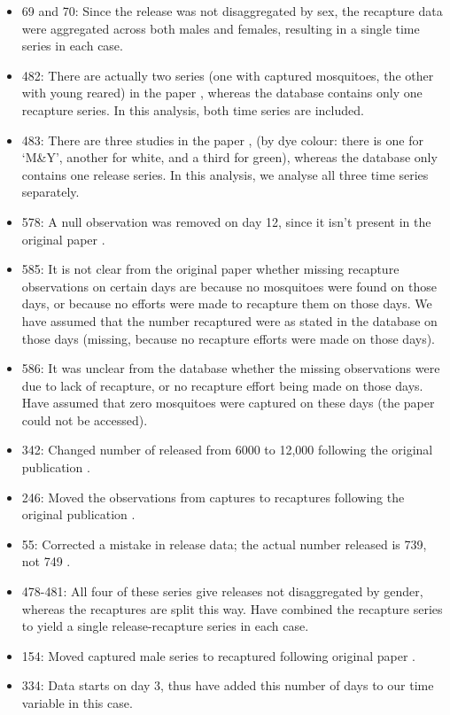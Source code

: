 \documentclass[12pt]{article}
\begin{document}
\begin{itemize}
	\item 69 and 70: Since the release was not disaggregated by sex, the recapture data were aggregated across both males and females, resulting in a single time series in each case.
	\item 482: There are actually two series (one with captured mosquitoes, the other with young reared) in the paper \cite[]{rawlings1981influence}, whereas the database contains only one recapture series. In this analysis, both time series are included.
	\item 483: There are three studies in the paper \cite[]{rawlings1981influence}, (by dye colour: there is one for `M\&Y', another for white, and a third for green), whereas the database only contains one release series. In this analysis, we analyse all three time series separately.
	\item 578: A null observation was removed on day 12, since it isn't present in the original paper \cite[]{eyles1943experiment}.
	\item 585: It is not clear from the original paper \cite[]{smith1941observations} whether missing recapture observations on certain days are because no mosquitoes were found on those days, or because no efforts were made to recapture them on those days. We have assumed that the number recaptured were as stated in the database on those days (missing, because no recapture efforts were made on those days).
	\item 586: It was unclear from the database whether the missing observations were due to lack of recapture, or no recapture effort being made on those days. Have assumed that zero mosquitoes were captured on these days (the paper could not be accessed).
	\item 342: Changed number of released from 6000 to 12,000 following the original publication \cite[]{bryan1991anopheles}.
	\item 246: Moved the observations from captures to recaptures following the original publication \cite[]{arredondo1998gonotrophic}.
	\item 55: Corrected a mistake in release data; the actual number released is 739, not 749 \cite[]{midega2007estimating}.
	\item 478-481: All four of these series give releases not disaggregated by gender, whereas the recaptures are split this way. Have combined the recapture series to yield a single release-recapture series in each case.
	\item 154: Moved captured male series to recaptured following original paper \cite[]{tsuda2001movement}. 
	\item 334: Data starts on day 3, thus have added this number of days to our time variable in this case.
\end{itemize}
\end{document}
